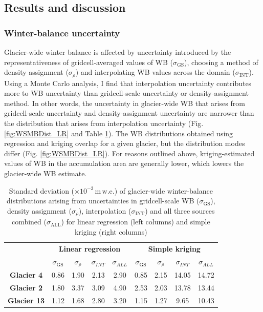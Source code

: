 \documentclass{sfuthesis}
\begin{document}
\subsection{Results and discussion}
\label{sec:Unc_results}

\subsubsection{Winter-balance uncertainty}

Glacier-wide winter balance is affected by uncertainty introduced by the representativeness of gridcell-averaged values of WB ($\sigma_{\mathrm{GS}}$), choosing a method of density assignment ($\sigma_{\rho}$) and interpolating WB values across the domain ($\sigma_{\mathrm{INT}}$). Using a Monte Carlo analysis, I find that interpolation uncertainty contributes more to WB uncertainty than gridcell-scale uncertainty or density-assignment method. In other words, the uncertainty in glacier-wide WB that arises from gridcell-scale uncertainty and density-assignment uncertainty are narrower than the distribution that arises from interpolation uncertainty (Fig. \ref{fig:WSMBDist_LR} and Table \ref{tab:WSMBdistribution_sigma}). The WB distributions obtained using regression and kriging overlap for a given glacier, but the distribution modes differ (Fig. \ref{fig:WSMBDist_LR}). For reasons outlined above, kriging-estimated values of WB in the accumulation area are generally lower, which lowers the glacier-wide WB estimate. 

 \begin{table}
\centering
\caption[Standard deviation ($\times10^{-3}$\,m\,w.e.) of glacier-wide winter-balance distributions arising from uncertainties in gridcell-scale WB ($\sigma_{\mathrm{GS}}$), density assignment ($\sigma_{\rho}$), interpolation ($\sigma_{\mathrm{INT}}$) and all three sources combined ($\sigma_{\mathrm{ALL}}$) for linear regression and simple kriging]{Standard deviation ($\times10^{-3}$\,m\,w.e.) of glacier-wide winter-balance distributions arising from uncertainties in gridcell-scale WB ($\sigma_{\mathrm{GS}}$), density assignment ($\sigma_{\rho}$), interpolation ($\sigma_{\mathrm{INT}}$) and all three sources combined ($\sigma_{\mathrm{ALL}}$) for linear regression (left columns) and simple kriging (right columns)}
\label{tab:WSMBdistribution_sigma}
\begin{tabular}{c|cccc|cccc}
 & \multicolumn{4}{c|}{\textbf{Linear regression}} & \multicolumn{4}{c}{\textbf{Simple kriging}} \\
\textbf{} & $\sigma_{\mathrm{GS}}$ & $\sigma_{\rho}$ & $\sigma_{INT}$ & $\sigma_{ALL}$ & $\sigma_{\mathrm{GS}}$ & $\sigma_{\rho}$ & $\sigma_{INT}$ & $\sigma_{ALL}$ \\ \hline
\textbf{Glacier 4} & 0.86 & 1.90 & 2.13 & 2.90 & 0.85 & 2.15 & 14.05 & 14.72 \\
\textbf{Glacier 2} & 1.80 & 3.37 & 3.09 & 4.90 & 2.53 & 2.03 & 13.78 & 13.44 \\
\textbf{Glacier 13} & 1.12 & 1.68 & 2.80 & 3.20 & 1.15 & 1.27 & 9.65 & 10.43
\end{tabular}
\end{table}
\end{document}
